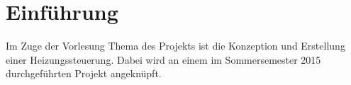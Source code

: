 \section{Einführung}
Im Zuge der Vorlesung \betreff
Thema des Projekts ist die Konzeption und Erstellung einer Heizungssteuerung. Dabei wird an einem im Sommersemester 2015 durchgeführten Projekt angeknüpft. 